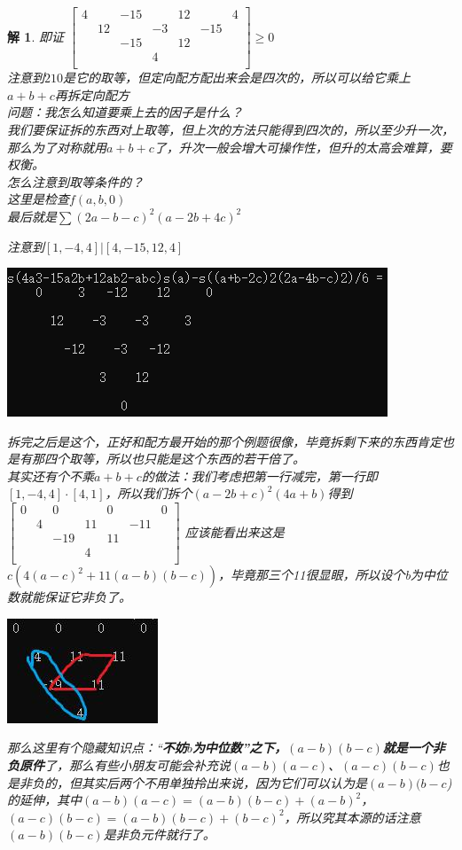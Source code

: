 \documentclass[UTF8]{ctexart}
\newtheorem{2}{解}
\begin{document}
\begin{2}
	即证
	$ \left[\begin{matrix}
		4& &-15& &12& &4\\
		&12& &-3& &-15&\\
		& &-15& &12& & \\
		& & &4& & &\\
	\end{matrix}\right] \ge 0$\\
	注意到$ 210 $是它的取等，但定向配方配出来会是四次的，所以可以给它乘上$ a+b+c $再拆定向配方\\
	问题：我怎么知道要乘上去的因子是什么？\\
	我们要保证拆的东西对上取等，但上次的方法只能得到四次的，所以至少升一次，那么为了对称就用$ a+b+c $了，升次一般会增大可操作性，但升的太高会难算，要权衡。\\
	怎么注意到取等条件的？\\
	这里是检查$ f(a,b,0) $\\
	最后就是$ \displaystyle \sum (2a-b-c)^{2}(a-2b+4c)^{2}$
	
	注意到$ [1,-4,4]|[4,-15,12,4] $
	\begin{center}
		\includegraphics[width=0.5\linewidth]{0360}
	\end{center}
	拆完之后是这个，正好和配方最开始的那个例题很像，毕竟拆剩下来的东西肯定也是有那四个取等，所以也只能是这个东西的若干倍了。\\
	其实还有个不乘$ a+b+c $的做法：我们考虑把第一行减完，第一行即$ [1,-4,4]·[4,1] $，所以我们拆个$ (a-2b+c)^{2}(4a+b) $得到$ \left[\begin{matrix}
		0& &0& &0& &0\\
		&4& &11& &-11&\\
		& &-19& &11& & \\
		& & &4& & &\\
	\end{matrix}\right] $
    应该能看出来这是$ c(4(a-c)^{2}+11(a-b)(b-c)) $，毕竟那三个11很显眼，所以设个b为中位数就能保证它非负了。
    \begin{center}
    	\includegraphics[width=0.3\linewidth]{0370}
    \end{center}
    那么这里有个隐藏知识点：“\textbf{不妨$ b $为中位数”之下，$ (a-b)(b-c) $就是一个非负原件}了，那么有些小朋友可能会补充说$ (a-b)(a-c) $、$ (a-c)(b-c) $也是非负的，但其实后两个不用单独拎出来说，因为它们可以认为是$ (a-b)(b-c $)的延伸，其中$ (a-b)(a-c)=(a-b)(b-c)+(a-b)^{2} $，$ (a-c)(b-c)=(a-b)(b-c)+(b-c)^{2} $，所以究其本源的话注意$ (a-b)(b-c) $是非负元件就行了。
\end{2}
\end{document}

